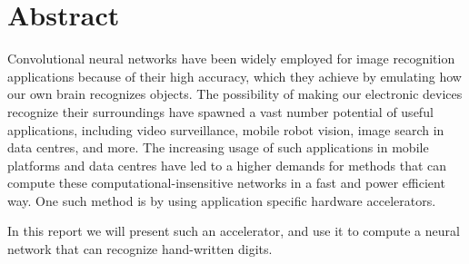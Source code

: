\section*{Abstract}

Convolutional neural networks have been widely employed for image recognition applications because of their high accuracy, which they achieve by emulating how our own brain recognizes objects. The possibility of making our electronic devices recognize their surroundings have spawned a vast number potential of useful applications, including video surveillance, mobile robot vision, image search in data centres, and more. The increasing usage of such applications in mobile platforms and data centres have led to a higher demands for methods that can compute these computational-insensitive networks in a fast and power efficient way. One such method is by using application specific hardware accelerators.

In this report we will present such an accelerator, and use it to compute a neural network that can recognize hand-written digits.
